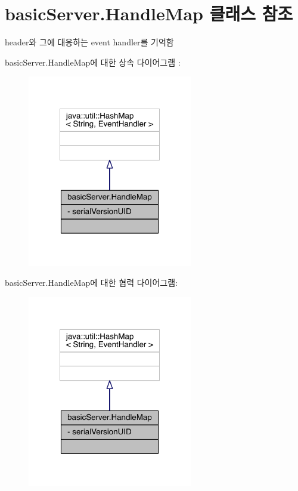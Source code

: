 \hypertarget{classbasic_server_1_1_handle_map}{\section{basic\+Server.\+Handle\+Map 클래스 참조}
\label{classbasic_server_1_1_handle_map}
}


header와 그에 대응하는 event handler를 기억함  




basic\+Server.\+Handle\+Map에 대한 상속 다이어그램 \+: \nopagebreak
\begin{figure}[H]
\begin{center}
\leavevmode
\includegraphics[width=204pt]{classbasic_server_1_1_handle_map__inherit__graph}
\end{center}
\end{figure}


basic\+Server.\+Handle\+Map에 대한 협력 다이어그램\+:\nopagebreak
\begin{figure}[H]
\begin{center}
\leavevmode
\includegraphics[width=204pt]{classbasic_server_1_1_handle_map__coll__graph}
\end{center}
\end{figure}
